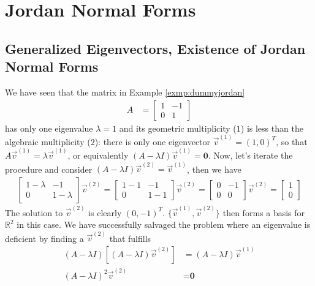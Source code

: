 \section{Jordan Normal Forms}
\label{sec:JNF}

\subsection{Generalized Eigenvectors, Existence of Jordan Normal Forms}

We have seen that the matrix in Example \ref{exmp:dummyjordan}
\begin{align*}
A &=
\begin{bmatrix}
1 & -1 \\
0 & 1
\end{bmatrix}
\end{align*}
has only one eigenvalue $\lambda = 1$ and its geometric multiplicity ($1$) is less than the algebraic multiplicity ($2$): there is only one eigenvector $\vec{v}^{(1)} = (1,0)^T$, so that $A\vec{v}^{(1)} = \lambda\vec{v}^{(1)}$, or equivalently $(A - \lambda I)\vec{v}^{(1)} = \textbf{0}$. Now, let's iterate the procedure and consider $(A - \lambda I)\vec{v}^{(2)} = \vec{v}^{(1)}$, then we have
\begin{align*}
\begin{bmatrix}
1-\lambda & -1 \\
0 & 1-\lambda
\end{bmatrix} 
\vec{v}^{(2)}
=
\begin{bmatrix}
1-1 & -1 \\
0 & 1-1
\end{bmatrix}
\vec{v}^{(2)} 
=
\begin{bmatrix}
0 & -1 \\
0 & 0
\end{bmatrix} 
\vec{v}^{(2)}
=
\begin{bmatrix}
1 \\
0
\end{bmatrix} 
\end{align*}
The solution to $\vec{v}^{(2)}$ is clearly $(0,-1)^T$. $\{\vec{v}^{(1)}, \vec{v}^{(2)}\}$ then forms a basis for $\mathbb{R}^2$ in this case. We have successfully salvaged the problem where an eigenvalue is deficient by finding a  $\vec{v}^{(2)}$ that fulfills
\begin{align*}
(A - \lambda I)[(A - \lambda I)\vec{v}^{(2)}] &= (A - \lambda I)\vec{v}^{(1)} \\
(A - \lambda I)^2\vec{v}^{(2)} &= \textbf{0}
\end{align*}
